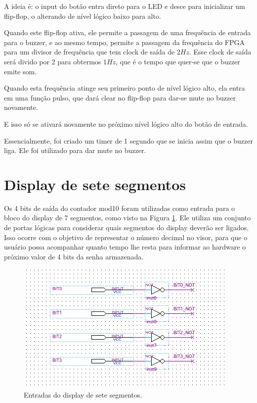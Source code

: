 A ideia é: o input do botão entra direto para o LED e desce para inicializar um flip-flop, o alterando de nível lógico baixo para alto.

Quando este flip-flop ativa, ele permite a passagem de uma frequência de entrada para o buzzer, e ao mesmo tempo, permite a passagem da frequência do FPGA para um divisor de frequência que tem clock de saída de $2Hz$. Esse clock de saída será divido por 2 para obtermos $1Hz$, que é o tempo que quer-se que o buzzer emite som.

Quando esta frequência atinge seu primeiro ponto de nível lógico alto, ela entra em uma função pulso, que dará clear no flip-flop para dar-se mute no buzzer novamente.

E isso só se ativará novamente no próximo nível lógico alto do botão de entrada.

Essencialmente, foi criado um timer de 1 segundo que se inicia assim que o buzzer liga. Ele foi utilizado para dar mute no buzzer.




\section{Display de sete segmentos}

Os 4 bits de saída do contador mod10 foram utilizadas como entrada para o bloco do display de 7 segmentos, como visto na Figura \ref{fig:2.21}. Ele utiliza um conjunto de portas lógicas para considerar quais segmentos do display deverão ser ligados. Isso ocorre com o objetivo de representar o número decimal no visor, para que o usuário possa acompanhar quanto tempo lhe resta para informar ao hardware o próximo valor de 4 bits da senha armazenada.

\begin{figure}[H]
	\centering
	\includegraphics[width=1\columnwidth]{FIGURAS/cap_2/EntradasBITS.png}
	\caption{Entradas do display de sete segmentos.}
        \label{fig:2.21}
\end{figure}


